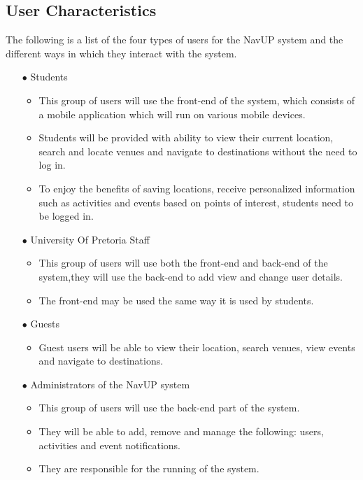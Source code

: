 \documentclass[a4paper,12pt]{article}
\begin{document}
\subsection{User Characteristics}
The following is a list of the four types of users for the NavUP system and the different ways in which
they interact with the system.
\begin{itemize} 
	\item[$\bullet$] Students
	\begin{itemize}  
	\item This group of users will use the front-end of the system, which consists of a mobile application which will run
	on various mobile devices.
	\item Students will be provided with ability to view their current location, search and locate venues and navigate to       			destinations without the need to log in.
	\item To enjoy the benefits of saving locations, receive personalized information such as activities and events based on 		       points of interest, students need to be logged in.
	 \end{itemize}
	\item[$\bullet$] University Of Pretoria Staff 
	\begin{itemize}
	\item This group of users will use both the front-end and back-end of the system,they will use the back-end 
	to add view and change user details. 
	\item The front-end may be used the same way it is used by students. 
	\end{itemize}  
	\item[$\bullet$] Guests  
	\begin{itemize}  
	\item Guest users will be able to view their location, search venues, view events and navigate to destinations. 
	\end{itemize}
	\item[$\bullet$] Administrators of the NavUP system 
	\begin{itemize}  
	\item This group of users will use the back-end part of the system. 
	\item They will be able to add, remove and manage the following: users, activities and event notifications.
	\item They are responsible for the running of the system. 
	\end{itemize}
\end{itemize}
\end{document}
